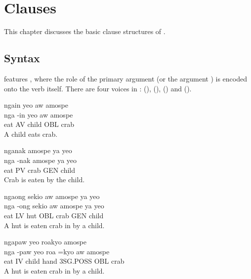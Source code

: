 \chapter{Clauses}
\label{ch:clauses}
This chapter discusses the basic clause structures of \langname{}.

\section{Syntax}
\langname{} features , where the role of the primary argument
(or the argument ) is encoded onto the verb itself. There are four voices in
\langname{}:  (\AV),  (\PV),  (\LV)
and  (\IV).
\begin{examples}
	\ex
	\label{ex:actor_voice}
	\script ngain yeo aw amospe \\
	\bits nga -in yeo aw amospe \\
	\gloss eat AV child OBL crab \\
	\tr A child eats crab.
\end{examples}

\begin{examples}
	\ex
	\label{ex:patient_voice}
	\script nganak amospe ya yeo \\
	\bits nga -nak amospe ya yeo \\
	\gloss eat PV crab GEN child \\
	\tr Crab is eaten by the child.
\end{examples}

\begin{examples}
	\ex
	\label{ex:locative_voice}
	\script ngaong sekio aw amospe ya yeo \\
	\bits nga -ong sekio aw amospe ya yeo \\
	\gloss eat LV hut OBL crab GEN child \\
	\tr A hut is eaten crab in by a child.
\end{examples}

\begin{examples}
	\ex
	\label{ex:instrumental_voice}
	\script ngapaw yeo roakyo amospe \\
	\bits nga -paw yeo roa =kyo aw amospe \\
	\gloss eat IV child hand 3SG.POSS OBL crab \\
	\tr A hut is eaten crab in by a child.
\end{examples}

